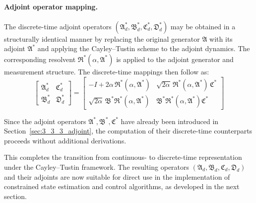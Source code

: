 \paragraph{Adjoint operator mapping.}  
The discrete-time adjoint operators $(\mathfrak{A}_d^*, \mathfrak{B}_d^*, \mathfrak{C}_d^*, \mathfrak{D}_d^*)$ may be obtained in a structurally identical manner by replacing the original generator $\mathfrak{A}$ with its adjoint $\mathfrak{A}^*$ and applying the Cayley--Tustin scheme to the adjoint dynamics. The corresponding resolvent $\mathfrak{R}^*(\alpha, \mathfrak{A}^*)$ is applied to the adjoint generator and measurement structure. The discrete-time mappings then follow as:
\begin{equation}
\begin{bmatrix}
\mathfrak{A}_d^* & \mathfrak{C}_d^* \\
\mathfrak{B}_d^* & \mathfrak{D}_d^*
\end{bmatrix}
=
\begin{bmatrix}
-I + 2\alpha\, \mathfrak{R}^*(\alpha, \mathfrak{A}^*) & \sqrt{2\alpha}\, \mathfrak{R}^*(\alpha, \mathfrak{A}^*)\, \mathfrak{C}^* \\
\sqrt{2\alpha}\, \mathfrak{B}^* \mathfrak{R}^*(\alpha, \mathfrak{A}^*) & \mathfrak{B}^* \mathfrak{R}^*(\alpha, \mathfrak{A}^*) \mathfrak{C}^*
\end{bmatrix}
\end{equation}

Since the adjoint operators $\mathfrak{A}^*, \mathfrak{B}^*, \mathfrak{C}^*$ have already been introduced in Section~\ref{sec:3_3_3_adjoint}, the computation of their discrete-time counterparts proceeds without additional derivations.

This completes the transition from continuous- to discrete-time representation under the Cayley--Tustin framework. The resulting operators $(\mathfrak{A}_d, \mathfrak{B}_d, \mathfrak{C}_d, \mathfrak{D}_d)$ and their adjoints are now suitable for direct use in the implementation of constrained state estimation and control algorithms, as developed in the next section.
